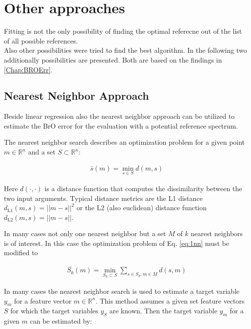 \documentclass  [
  paper    = a4,
  BCOR     = 10mm,
  twoside,
  fontsize = 12pt,
  fleqn,
  toc      = bibnumbered,
  toc      = listofnumbered,
  numbers  = noendperiod,
  headings = normal,
  listof   = leveldown,
  version  = 3.03
]                                       {scrreprt}
\begin{document}
	\section{Other approaches}

	Fitting is not the only possibility of finding the optimal referecne out of the list of all possible references.\\
	Also other possibilities were tried to find the best algorithm. In the following two additionally possibilities are presented. Both are based on the findings in \cref{Chap:BROErr}. 

\subsection{Nearest Neighbor Approach}


Beside linear regression also the nearest neighbor approach can be utilized to estimate the BrO error for the evaluation with a potential reference spectrum.


The nearest neighbor search describes an optimization problem for a given point $m \in \mathbb{R}^n$ and a set $S \subset \mathbb{R}^n$:

%

\begin{align}
\bar{s}(m) = \min_{s \in S} d(m, s) \label{eq:1nn}
\end{align}

%
Here $d(\cdot, \cdot)$ is a distance function that computes the dissimilarity between the two input arguments. Typical distance metrics are the L1 distance $d_{\text{L1} 	
}(m, s) = ||m - s||^2$ or the L2 (also euclidean) distance function $d_{\text{L2} 
}(m, s) = ||m - s||$. 


In many cases not only one nearest neighbor but a set $M$ of $k$ nearest neighbors is of interest. In this case the optimization problem of Eq. \ref{eq:1nn} must be modified to

%

\begin{align}
\bar{S_k}(m) = \min_{S_k \subset S} \sum_{s \in S_k, m \in M} d(s, m) \label{eq:knn}
\end{align}

%

In many cases the nearest neighbor search is used to estimate a target variable $y_m$ for a feature vector $m \in \mathbb{R}^n$. This method assumes a given set feature vectors $S$ for which the target variables $y_S$ are known. Then the target variable $y_m$ for a given $m$ can be estimated by:
\end{document}
